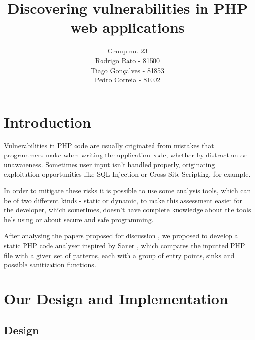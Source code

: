 \documentclass[10pt,onecolumn,a4paper]{article}
\begin{document}
	\title{Discovering vulnerabilities in PHP web applications}
	\author{Group no. 23\\Rodrigo Rato - 81500\\Tiago Gonçalves - 81853\\Pedro Correia - 81002}
	\maketitle



%
%
\section{Introduction}

\hspace{3.5mm} Vulnerabilities in PHP code are usually originated from mistakes that programmers make when writing the application code, whether by distraction or unawareness. Sometimes user input isn't handled properly, originating exploitation opportunities like SQL Injection\cite{SQLI} or Cross Site Scripting\cite{XSS}, for example. 

In order to mitigate these risks it is possible to use some analysis tools, which can be of two different kinds - static or dynamic, to make this assessment easier for the developer, which sometimes, doesn't have complete knowledge about the tools he's using or about secure and safe programming.

After analysing the papers proposed for discussion \cite{PROPOSED1}\cite{PROPOSED2}\cite{PROPOSED3}\cite{PROPOSED4}, we proposed to develop a static PHP code analyser inspired by Saner \cite{PROPOSED3}, which compares the inputted PHP file with a given set of patterns, each with a group of entry points, sinks and possible sanitization functions.


%
%
\section{Our Design and Implementation}
	\subsection{Design}
\end{document}
